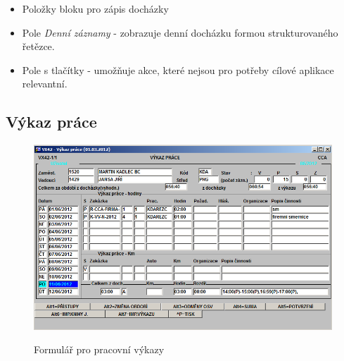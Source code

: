 \documentclass{diplomka}
\begin{document}
\begin{itemize}[noitemsep,nolistsep]
\item Položky bloku pro zápis docházky
\item Pole \emph{Denní záznamy} - zobrazuje denní docházku formou strukturovaného řetězce.
\item Pole s tlačítky - umožňuje akce, které nejsou pro potřeby cílové aplikace relevantní.
\end{itemize}

\newpage
\subsection{Výkaz práce}
\begin{figure}[H]
  \centering
  \includegraphics[scale=0.7]{obr/VX42.png}
\label{obr:rep}
\caption{Formulář pro pracovní výkazy}
\end{figure}
\end{document}
